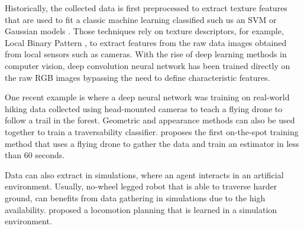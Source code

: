 \documentclass[../document.tex]{subfiles}
\begin{document}
Historically, the collected data is first preprocessed to extract texture features that are used to fit a classic machine learning classified such us an SVM \cite{ugur2010traversability} or Gaussian models \cite{sofman2006improving}. Those techniques rely on texture descriptors, for example, Local Binary Pattern \cite{ojala2002multiresolution}, to extract features from the raw data images obtained from local sensors such as cameras.
With the rise of deep learning methods in computer vision, deep convolution neural network has been trained directly on the raw RGB images bypassing the need to define characteristic features.

One recent example is \cite{giusti2015amachine} where a deep neural network was training on real-world hiking data collected using head-mounted cameras to teach a flying drone to follow a trail in the forest. 
Geometric and appearance methods can also be used together to train a traversability classifier. \cite{delmerico2017onthespot} proposes the first on-the-spot training method that uses a flying drone to gather the data and train an estimator in less than 60 seconds. 

Data can also extract in simulations, where an agent interacts in an artificial environment. Usually, no-wheel legged robot that is able to traverse harder ground, can benefits from data gathering in simulations due to the high availability. \cite{tobias2017anytime} proposed a locomotion planning that is learned in a simulation environment. 
\end{document}
